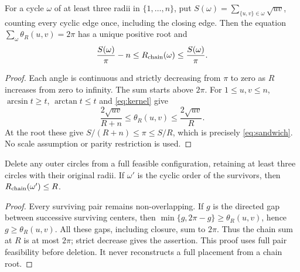 \documentclass[review,supplement,hidelinks,onefignum,onetabnum]{siamart251216}
\newcommand{\Rc}{R_{\rm chain}}
\begin{document}
\begin{lemma}\label{lem:sandwich}
For a cycle $\omega$ of at least three radii in $\{1,\ldots,n\}$, put
$S(\omega)=\sum_{\{u,v\}\in\omega}\sqrt{uv}$, counting every cyclic edge
once, including the closing edge. Then the equation
$\sum_{\omega}\theta_R(u,v)=2\pi$ has a unique positive root and
\begin{equation}\label{eq:sandwich}
\frac{S(\omega)}\pi-n\le\Rc(\omega)\le\frac{S(\omega)}\pi.
\end{equation}
\end{lemma}
\begin{proof}
Each angle is continuous and strictly decreasing from $\pi$ to zero as
$R$ increases from zero to infinity. The sum starts above $2\pi$.
For $1\le u,v\le n$, $\arcsin t\ge t$, $\arctan t\le t$ and
\eqref{eq:kernel} give
\[
\frac{2\sqrt{uv}}{R+n}\le\theta_R(u,v)\le\frac{2\sqrt{uv}}R.
\]
At the root these give $S/(R+n)\le\pi\le S/R$, which is precisely
\eqref{eq:sandwich}. No scale assumption or parity restriction is used.
\end{proof}

\begin{lemma}\label{lem:deletiongeometry}
Delete any outer circles from a full feasible configuration, retaining
at least three circles with their original radii. If $\omega'$ is the
cyclic order of the survivors, then $\Rc(\omega')\le R$.
\end{lemma}
\begin{proof}
Every surviving pair remains non-overlapping. If $g$ is the directed gap
between successive surviving centers, then
$\min\{g,2\pi-g\}\ge\theta_R(u,v)$, hence $g\ge\theta_R(u,v)$.
All these gaps, including closure, sum to $2\pi$. Thus the chain sum
at $R$ is at most $2\pi$; strict decrease gives the assertion.
This proof uses full pair feasibility before deletion. It never reconstructs
a full placement from a chain root.
\end{proof}
\end{document}
